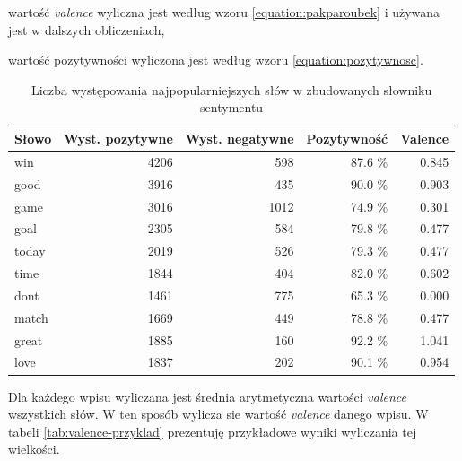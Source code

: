 wartość \textit{valence} wyliczna jest według wzoru \ref{equation:pakparoubek} 
i używana jest w dalszych obliczeniach,

wartość pozytywności wyliczona jest według wzoru \ref{equation:pozytywnosc}.

\begin{table}[ht!]  
\begin{center}  
\begin{tabular}{|l|r|r|r|r|}
\hline
Słowo & Wyst. pozytywne  & Wyst. negatywne 
& Pozytywność
& Valence
\\ \hline 
win & 4206 & 598 & 87.6 \% & 0.845 \\ \hline
good & 3916 & 435 & 90.0 \% & 0.903 \\ \hline
game & 3016 & 1012 & 74.9 \% & 0.301 \\ \hline
goal & 2305 & 584 & 79.8 \% & 0.477 \\ \hline
today & 2019 & 526 & 79.3 \% & 0.477 \\ \hline
time & 1844 & 404 & 82.0 \% & 0.602 \\ \hline
dont & 1461 & 775 & 65.3 \% & 0.000 \\ \hline
match & 1669 & 449 & 78.8 \% & 0.477 \\ \hline
great & 1885 & 160 & 92.2 \% & 1.041 \\ \hline
love & 1837 & 202 & 90.1 \% & 0.954 \\ \hline
\end{tabular} 
\end{center} 
\caption{Liczba występowania najpopularniejszych słów w zbudowanych słowniku
sentymentu}
\label{tab:liczebnosc-slow-sentymentu}
\end{table}

Dla każdego wpisu wyliczana jest średnia arytmetyczna wartości \textit{valence}
wszystkich słów. W ten sposób wylicza sie wartość \textit{valence} danego wpisu.
W tabeli \ref{tab:valence-przyklad} prezentuję przykładowe wyniki wyliczania tej
wielkości.

